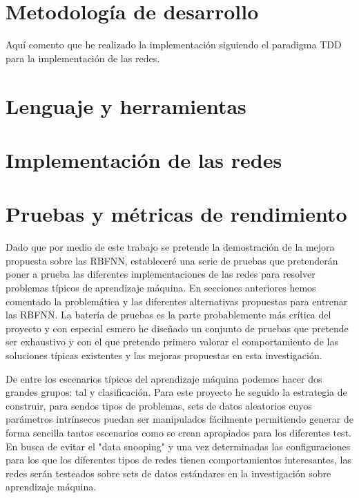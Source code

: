 \documentclass[10pt,a4paper, twocolumn]{report}
\begin{document}
\section{Metodología de desarrollo}
Aquí comento que he realizado la implementación siguiendo el paradigma TDD para la implementación de las redes.
\section{Lenguaje y herramientas}
\section{Implementación de las redes}
\section{Pruebas y métricas de rendimiento}
Dado que por medio de este trabajo se pretende la demostración de la mejora propuesta sobre las RBFNN, estableceré una serie de pruebas que pretenderán poner a prueba las diferentes implementaciones de las redes para resolver problemas típicos de aprendizaje máquina.
En secciones anteriores hemos comentado la problemática y las diferentes alternativas propuestas para entrenar las RBFNN. La batería de pruebas es la parte probablemente más crítica del proyecto y con especial esmero he diseñado un conjunto de pruebas que pretende ser exhaustivo y con el que pretendo primero valorar el comportamiento de las soluciones típicas existentes y las mejoras propuestas en esta investigación.

De entre los escenarios típicos del aprendizaje máquina podemos hacer dos grandes grupos: tal y clasificación. Para este proyecto he seguido la estrategia de construir, para sendos tipos de problemas, sets de datos aleatorios cuyos parámetros intrínsecos puedan ser manipulados fácilmente permitiendo generar de forma sencilla tantos escenarios como se crean apropiados para los diferentes test. En busca de evitar el "data snooping" y una vez determinadas las configuraciones para los que los diferentes tipos de redes tienen comportamientos interesantes, las redes serán testeados sobre sets de datos estándares en la investigación sobre aprendizaje máquina.
\end{document}
